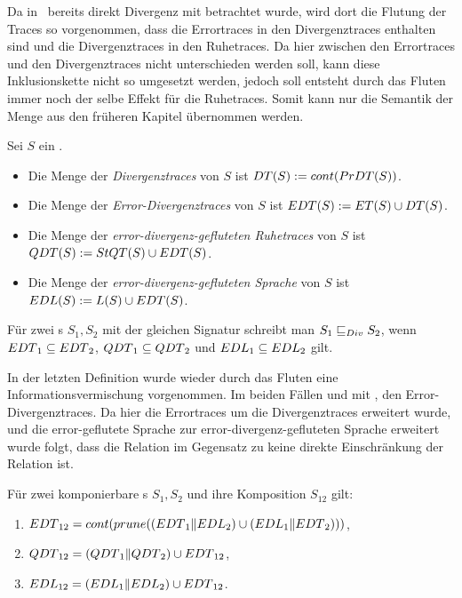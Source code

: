 Da in~\cite{Chilton2013} bereits direkt Divergenz mit betrachtet wurde, wird
dort die Flutung der Traces so vorgenommen, dass die Errortraces in den
Divergenztraces enthalten sind und die Divergenztraces in den Ruhetraces. Da
hier zwischen den Errortraces und den Divergenztraces nicht unterschieden
werden soll, kann diese Inklusionskette nicht so umgesetzt werden, jedoch soll
entsteht durch das Fluten immer noch der selbe Effekt für die Ruhetraces. Somit
kann nur die Semantik der Menge \ET{} aus den früheren Kapitel übernommen
werden.

\begin{Def}
\label{DefRuheDivSemantik}
  Sei $S$ ein \EIO{}.
  \begin{itemize}
    \item Die Menge der \emph{Divergenztraces} von $S$ ist $DT{}(S) :=
      cont{}(PrDT{}(S))$.
    \item Die Menge der \emph{Error-Divergenztraces} von $S$ ist $EDT{}(S) :=
      ET{}(S)\cup DT{}(S)$.
    \item Die Menge der \emph{error-divergenz-gefluteten Ruhetraces} von $S$
      ist $QDT{}(S) := StQT{}(S)\cup EDT{}(S)$.
    \item Die Menge der \emph{error-divergenz-gefluteten Sprache} von $S$ ist
      $EDL{}(S) := L(S) \cup EDT{}(S)$.
  \end{itemize}
  Für zwei \EIO{}s $S_1, S_2$ mit der gleichen Signatur schreibt man $S_1\sqsubseteq _{Div}
  S_2$, wenn $EDT{}_1\subseteq EDT{}_2$, $QDT{}_1\subseteq QDT{}_2$ und
  $EDL{}_1\subseteq EDL{}_2$ gilt.
\end{Def}

In der letzten Definition wurde wieder durch das Fluten eine
Informationsvermischung vorgenommen. Im beiden Fällen \QDT{} und \EDL{} mit
\EDT{}, den Error-Divergenztraces. Da hier die Errortraces um die
Divergenztraces erweitert wurde, und die error-geflutete Sprache zur
error-divergenz-gefluteten Sprache erweitert wurde folgt, dass die Relation
\DRel{} im Gegensatz zu \QRel{} keine direkte Einschränkung der Relation
\ERel{} ist.

\begin{satz}
\label{satzDivSemantik}
  Für zwei komponierbare \EIO{}s $S_1, S_2$ und ihre Komposition
  $S_{12}$ gilt:
  \begin{enumerate}
    \item $EDT{}_{12}=cont (prune ((EDT{}_1\|EDL{}_2)\cup
      (EDL{}_1\|EDT{}_2)))$,
    \item $QDT{}_{12}=(QDT{}_1\|QDT{}_2)\cup EDT{}_{12}$,
    \item $EDL{}_{12}=(EDL{}_1\|EDL{}_2)\cup EDT{}_{12}$.
  \end{enumerate}
\end{satz}

